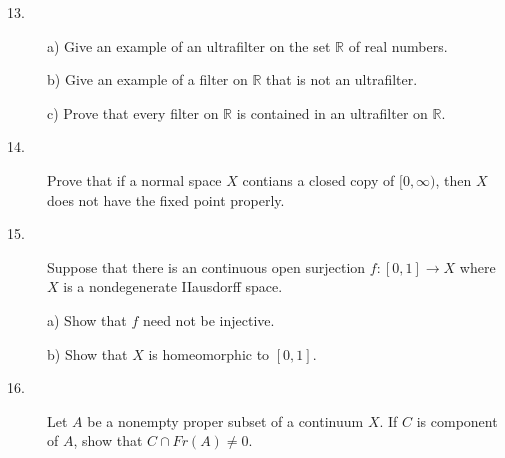 \documentclass{article}
\def\R{\mathbb R}
\begin{document}
\begin{description}
\item[13.] a)
Give an example of an ultrafilter on the set $\R$ of real numbers.

\item[\quad] b)
Give an example of a filter on $\R$ that is not an ultrafilter.

\item[\quad] c)
Prove that every filter on $\R$ is contained in an ultrafilter
on $\R$.

\item[14.]
Prove that if a normal space $X$ contians a closed copy of $[0, \infty)$,
then $X$ does not have the fixed point properly.

\item[15.]
Suppose that there is an continuous open surjection $f: [0,1] \to X$
where $X$ is a nondegenerate IIausdorff space.

\item[\quad] a)
Show that $f$ need not be injective.

\item[\quad] b)
Show that $X$ is homeomorphic to $[0,1]$.

\item[16.]
Let $A$ be a nonempty proper subset of a continuum $X$. If $C$ is
component of $A$, show that $C \cap Fr(A) \neq 0$.





\end{description}    
\end{document}
